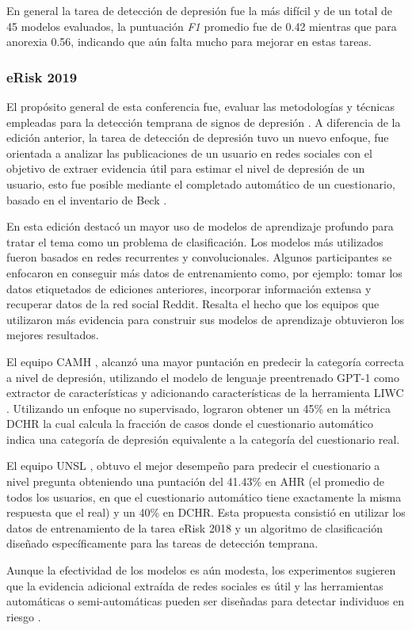 En general la tarea de detección de depresión fue la más difícil y de un total de 45 modelos evaluados, la puntuación \textit{F1} promedio fue de 0.42 mientras que para anorexia 0.56, indicando que aún falta mucho para mejorar en estas tareas. 

\subsubsection{eRisk 2019}
El propósito general de esta conferencia fue, evaluar las metodologías y técnicas empleadas para la detección temprana de signos de depresión \citep{Losada2019}. A diferencia de la edición anterior, la tarea de detección de depresión tuvo un nuevo enfoque, fue orientada a analizar las publicaciones de un usuario en redes sociales con el objetivo de extraer evidencia útil para estimar el nivel de depresión de un usuario, esto fue posible mediante el completado automático de un cuestionario, basado en el inventario de Beck \cite{beck1961inventory}. 

En esta edición destacó un mayor uso de modelos de aprendizaje profundo para tratar el tema como un problema de clasificación. Los modelos más utilizados fueron basados en redes recurrentes y convolucionales. Algunos participantes se enfocaron en conseguir más datos de entrenamiento como, por ejemplo:  tomar los datos etiquetados de ediciones anteriores, incorporar información extensa y recuperar datos de la red social Reddit. Resalta el hecho que los equipos que utilizaron más evidencia para construir sus modelos de aprendizaje obtuvieron los mejores resultados.

El equipo CAMH \citep{Abed-Esfahani2019}, alcanzó una mayor puntación en predecir la categoría correcta a nivel de depresión, utilizando el modelo de lenguaje preentrenado GPT-1 como extractor de características y adicionando características de la herramienta LIWC \citep{pennebaker2001linguistic}. Utilizando un enfoque no supervisado, lograron obtener un 45\% en la métrica DCHR la cual calcula la fracción de casos donde el cuestionario automático indica una categoría de depresión equivalente a la categoría del cuestionario real.

El equipo UNSL \citep{Burdisso2019}, obtuvo el mejor desempeño para predecir el cuestionario a nivel pregunta obteniendo una puntación del 41.43\% en AHR (el promedio de todos los usuarios, en que el cuestionario automático tiene exactamente la misma respuesta que el real) y un 40\% en DCHR. Esta propuesta consistió en utilizar los datos de entrenamiento de la tarea eRisk 2018 y un algoritmo de clasificación diseñado específicamente para las tareas de detección temprana.

Aunque la efectividad de los modelos es aún modesta, los experimentos sugieren que la evidencia adicional extraída de redes sociales es útil y las herramientas automáticas o semi-automáticas pueden ser diseñadas para detectar individuos en riesgo \citep{losada2019overview}.